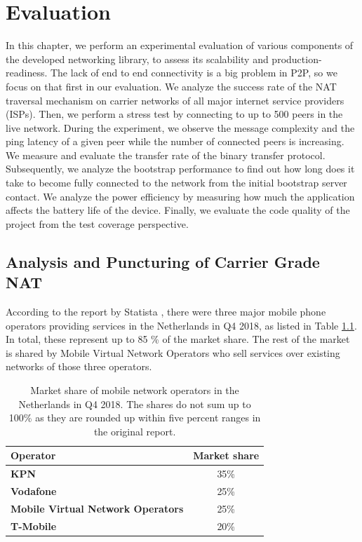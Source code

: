 
\chapter{Evaluation}

In this chapter, we perform an experimental evaluation of various components of the developed networking library, to assess its scalability and production-readiness. The lack of end to end connectivity is a big problem in P2P, so we focus on that first in our evaluation. We analyze the success rate of the NAT traversal mechanism on carrier networks of all major internet service providers (ISPs). Then, we perform a stress test by connecting to up to 500 peers in the live network. During the experiment, we observe the message complexity and the ping latency of a given peer while the number of connected peers is increasing. We measure and evaluate the transfer rate of the binary transfer protocol. Subsequently, we analyze the bootstrap performance to find out how long does it take to become fully connected to the network from the initial bootstrap server contact. We analyze the power efficiency by measuring how much the application affects the battery life of the device. Finally, we evaluate the code quality of the project from the test coverage perspective.

\section{Analysis and Puncturing of Carrier Grade NAT}

According to the report by Statista \cite{statista:marketshare}, there were three major mobile phone operators providing services in the Netherlands in Q4 2018, as listed in Table \ref{table_marketshare}. In total, these represent up to 85 \% of the market share. The rest of the market is shared by Mobile Virtual Network Operators who sell services over existing networks of those three operators.

\begin{table}
    \centering
    \begin{tabular}{ | l | c | }
        \hline
        \textbf{Operator} & \textbf{Market share} \\
        \hline
        \textbf{KPN} & 35\% \\
        \textbf{Vodafone} & 25\% \\
        \textbf{Mobile Virtual Network Operators} & 25\% \\
        \textbf{T-Mobile} & 20\% \\
        \hline
    \end{tabular}
    \caption{Market share of mobile network operators in the Netherlands in Q4 2018. The shares do not sum up to 100\% as they are rounded up within five percent ranges in the original report. \cite{statista:marketshare}}
    \label{table_marketshare}
\end{table}

